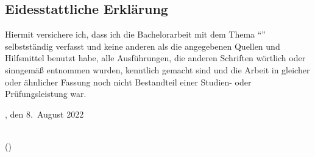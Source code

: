 \subsection*{Eidesstattliche Erklärung}\label{subsec:eidesstattliche-erklärung}

	Hiermit versichere ich, dass ich die Bachelorarbeit mit dem Thema \enquote{\myTitle}
	selbstständig verfasst und keine anderen als die angegebenen Quellen und Hilfsmittel
	benutzt habe, alle Ausführungen, die anderen Schriften wörtlich oder sinngemäß
	entnommen wurden, kenntlich gemacht sind und die Arbeit in gleicher oder ähnlicher
	Fassung noch nicht Bestandteil einer Studien- oder Prüfungsleistung war.

	\vspace*{5cm}

	\noindent
	\begin{minipage}[b]{0.4\textwidth}
		\myStudylocation, den 8.\ August 2022
		\vspace*{2.5mm}
	\end{minipage}
	\hfill
	\begin{minipage}[t]{0.4\textwidth}
		\begin{center}
			\dotfill\\
			(\myAuthor)
		\end{center}
	\end{minipage}
